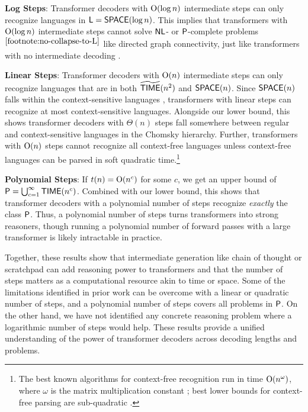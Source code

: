 \documentclass{article}
\begin{document}
\begin{compactenum}
    \item \textbf{Log Steps}: Transformer decoders with $\O(\log n)$ intermediate steps can only recognize languages in $\L = \SPACE(\log n)$.
    This implies that transformers with $\O(\log n)$ intermediate steps cannot solve $\NL$- or $\P$-complete problems$^{\ref{footnote:no-collapse-to-L}}$ like directed graph connectivity, just like transformers with no intermediate decoding \citep{merrill2023parallelism}.
    
    \item \textbf{Linear Steps}: Transformer decoders with $\O(n)$ intermediate steps can only recognize languages that are in both $\tildeTIME(n^2)$ and $\SPACE(n)$. Since $\SPACE(n)$ falls within the context-sensitive languages \citep{kuroda1964classes}, transformers with linear steps can recognize at most context-sensitive languages. Alongside our lower bound, this shows transformer decoders with $\Theta(n)$ steps fall somewhere between regular and context-sensitive languages in the Chomsky hierarchy. Further, transformers with $\O(n)$ steps cannot recognize all context-free languages unless context-free languages can be parsed in soft quadratic time.\footnote{The best known algorithms for context-free recognition run in time $\O(n^\omega)$, where $\omega$ is the matrix multiplication constant \citep{valiant1975general}; best lower bounds for context-free parsing are sub-quadratic \citep{lee2002fast}.}
    
    \item \textbf{Polynomial Steps}: If $t(n) = \O(n^c)$ for some $c$, we get an upper bound of $\P = \bigcup_{c=1}^\infty \TIME(n^c)$. Combined with our lower bound, this shows that transformer decoders with a polynomial number of steps recognize \emph{exactly} the class $\P$. Thus, a polynomial number of steps turns transformers into strong reasoners, though running a polynomial number of forward passes with a large transformer is likely intractable in practice.
\end{compactenum}

Together, these results show that intermediate generation like chain of thought or scratchpad can add reasoning power to transformers and that the number of steps matters as a computational resource akin to time or space. Some of the limitations identified in prior work \cite[][etc.]{merrill2023parallelism,chiang2023tighter} can be overcome with a linear or quadratic number of steps, and a polynomial number of steps covers all problems in $\P$. On the other hand, we have not identified any concrete reasoning problem where a logarithmic number of steps would help. These results provide a unified understanding of the power of transformer decoders across decoding lengths and problems.
\end{document}
